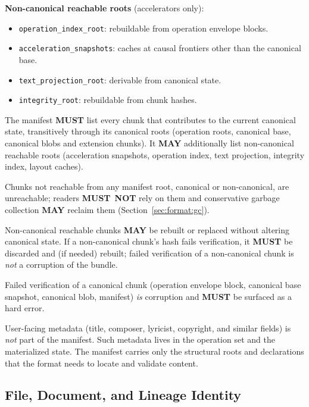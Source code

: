 \documentclass[11pt,letterpaper]{report}
\newcounter{requirement}[chapter]
\newcommand{\MUST}{\textbf{MUST}}
\newcommand{\MUSTNOT}{\textbf{MUST}\nobreak\ \textbf{NOT}}
\newcommand{\MAY}{\textbf{MAY}}
\begin{document}
\textbf{Non-canonical reachable roots} (accelerators only):

\begin{itemize}
  \item \texttt{operation\_index\_root}: rebuildable from
    operation envelope blocks.
  \item \texttt{acceleration\_snapshots}: caches at causal
    frontiers other than the canonical base.
  \item \texttt{text\_projection\_root}: derivable from canonical
    state.
  \item \texttt{integrity\_root}: rebuildable from chunk hashes.
\end{itemize}

\begin{requirement}
  \label{req:format:manifest-reachability}
  The manifest \MUST{} list every chunk that contributes to the
  current canonical state, transitively through its canonical
  roots (operation roots, canonical base, canonical blobs and
  extension chunks). It \MAY{} additionally list non-canonical
  reachable roots (acceleration snapshots, operation index, text
  projection, integrity index, layout caches).

  Chunks not reachable from any manifest root, canonical or
  non-canonical, are unreachable; readers \MUSTNOT{} rely on
  them and conservative garbage collection \MAY{} reclaim them
  (Section~\ref{sec:format:gc}).

  Non-canonical reachable chunks \MAY{} be rebuilt or replaced
  without altering canonical state. If a non-canonical chunk's
  hash fails verification, it \MUST{} be discarded and (if
  needed) rebuilt; failed verification of a non-canonical chunk
  is \emph{not} a corruption of the bundle.

  Failed verification of a canonical chunk (operation envelope
  block, canonical base snapshot, canonical blob, manifest)
  \emph{is} corruption and \MUST{} be surfaced as a hard error.

  User-facing metadata (title, composer, lyricist, copyright, and
  similar fields) is \emph{not} part of the manifest. Such metadata
  lives in the operation set and the materialized state. The
  manifest carries only the structural roots and declarations that
  the format needs to locate and validate content.
\end{requirement}

\subsection{File, Document, and Lineage Identity}
\label{sec:format:identity}
\end{document}
